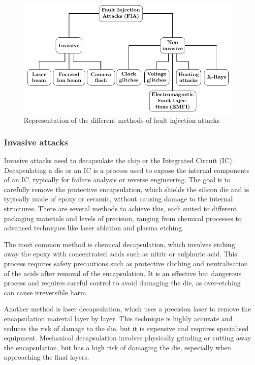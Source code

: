 \begin{figure}[ht]
    \centering
    \includegraphics[page=2, width=.75\textwidth]{c2_soa/img/physicalAttacks.pdf}
    \caption{Representation of the different methods of fault injection attacks}
    \label{fig:fia}
\end{figure}

\subsubsection{Invasive attacks}
\label{subsubsection:invasiveAttacks}
Invasive attacks need to decapsulate the chip or the Integrated Circuit (IC).
Decapsulating a die or an IC is a process used to expose the internal components of an IC, typically for failure analysis or reverse engineering. The goal is to carefully remove the protective encapsulation, which shields the silicon die and is typically made of epoxy or ceramic, without causing damage to the internal structures. There are several methods to achieve this, each suited to different packaging materials and levels of precision, ranging from chemical processes to advanced techniques like laser ablation and plasma etching.

The most common method is chemical decapsulation, which involves etching away the epoxy with concentrated acids such as nitric or sulphuric acid. This process requires safety precautions such as protective clothing and neutralisation of the acids after removal of the encapsulation. It is an effective but dangerous process and requires careful control to avoid damaging the die, as over-etching can cause irreversible harm.

Another method is laser decapsulation, which uses a precision laser to remove the encapsulation material layer by layer. This technique is highly accurate and reduces the risk of damage to the die, but it is expensive and requires specialised equipment. Mechanical decapsulation involves physically grinding or cutting away the encapsulation, but has a high risk of damaging the die, especially when approaching the final layers.

